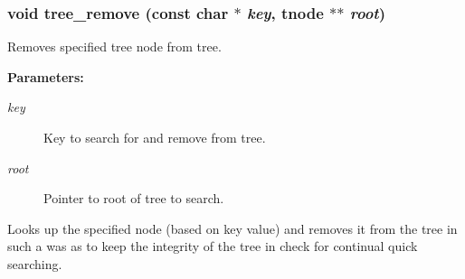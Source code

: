 \subsubsection{\setlength{\rightskip}{0pt plus 5cm}void tree\_\-remove (const char $\ast$ {\em key}, {\bf tnode} $\ast$$\ast$ {\em root})}\label{tree_8c_a2}


Removes specified tree node from tree.

\begin{Desc}
\item[{\bf Parameters: }]\par
\begin{description}
\item[
{\em key}]Key to search for and remove from tree. \item[
{\em root}]Pointer to root of tree to search.

\end{description}
\end{Desc}
Looks up the specified node (based on key value) and removes it from the tree in such a was as to keep the integrity of the tree in check for continual quick searching. 